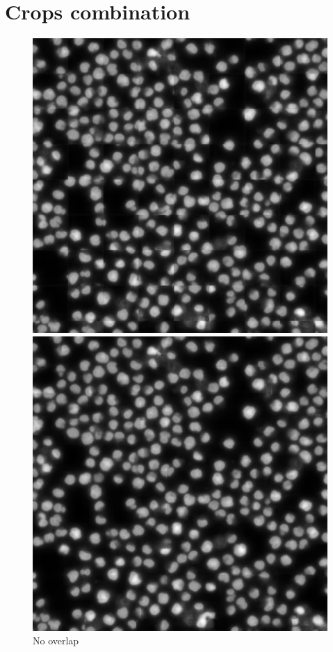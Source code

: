 \section{Crops combination}
\begin{figure}[htb]
    \centering
    \begin{minipage}{.48\textwidth}
      \centering
      \includegraphics[width=\linewidth]{bilder/crops_combination/prediction_border_0.png}
      \caption{No overlap}
      \label{fig:crops_combination_0}
    \end{minipage}%
    \vspace{1cm}
    \begin{minipage}{.48\textwidth}
      \centering
      \includegraphics[width=\linewidth]{bilder/crops_combination/prediction_border_34.png}

\end{minipage}
\end{figure}

